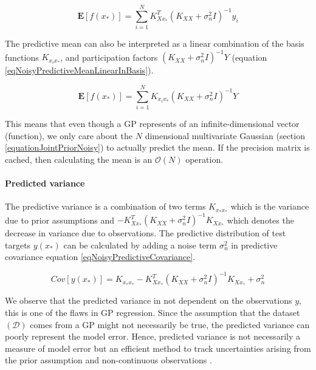   \begin{equation}\label{eqNoisyPredictiveMeanLinearInY}
  \mathbf{E}[f(x_{*})] = \sum_{i = 1}^{N} K_{Xx_{*}}^{T}( K_{XX} + \sigma^{2}_{n}I)^{-1}y_{i}
  \end{equation}

The predictive mean can also be interpreted as a linear combination of the basis functions $K_{x_{i}x_{*}}$, and participation factors $( K_{XX} + \sigma^{2}_{n}I)^{-1}Y$ (equation \ref{eqNoisyPredictiveMeanLinearInBasis}). 

  \begin{equation}\label{eqNoisyPredictiveMeanLinearInBasis}
  \mathbf{E}[f(x_{*})] = \sum_{i = 1}^{N} K_{x_{i}x_{*}}( K_{XX} + \sigma^{2}_{n}I)^{-1}Y
  \end{equation}
  
This means that even though a GP represents of an infinite-dimensional vector (function), we only care about the $N$ dimensional multivariate Gaussian (section \ref{equationJointPriorNoisy}) to actually predict the mean. If the precision matrix is cached, then calculating the mean is an $\mathcal{O}\left ( N \right )$ operation.

\paragraph{Predicted variance}
The predictive variance is a combination of two terms $K_{x_{*}x_{*}}$ which is the variance due to prior assumptions and $- K_{Xx_{*}}^{T}( K_{XX} + \sigma^{2}_{n}I )^{-1} K_{Xx_{*}}$ which denotes the decrease in variance due to observations. The predictive distribution of test targets $y(x_{*})$ can be calculated by adding a noise term $\sigma^{2}_{n}$ in predictive covariance equation \ref{eqNoisyPredictiveCovariance}. 

  \begin{equation}\label{eqNoisyPredictiveCovarianceOnNoisyTarget}
	Cov[y(x_{*})] = K_{x_{*}x_{*}} - K_{Xx_{*}}^{T}( K_{XX} + \sigma^{2}_{n}I )^{-1} K_{Xx_{*}} + \sigma_{n}^{2}
  \end{equation}
  
We observe that the predicted variance in not dependent on the observations $y$, this is one of the flaws in GP regression. Since the assumption that the dataset $(\mathcal{D})$ comes from a GP might not necessarily be true, the predicted variance can poorly represent the model error. Hence, predicted variance is not necessarily a measure of model error but an efficient method to track uncertainties arising from the prior assumption and non-continuous observations \cite{shah2014student}.

